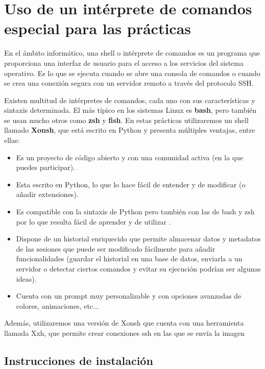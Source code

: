 \section{Uso de un intérprete de comandos especial para las prácticas}

En el ámbito informático, una shell o intérprete de comandos es un programa que proporciona una interfaz de usuario para el acceso a los servicios del sistema operativo. Es lo que se ejecuta cuando se abre una consola de comandos o cuando se crea una conexión segura con un servidor remoto a través del protocolo SSH.

Existen multitud de intérpretes de comandos, cada uno con sus características y sintaxis determinada. El más típico en los sistemas Linux es \textbf{bash}, pero también se usan mucho otros como \textbf{zsh} y \textbf{fish}. En estas prácticas utilizaremos un shell llamado \textbf{Xonsh}, que está escrito en Python y presenta múltiples ventajas, entre ellas:

\begin{itemize}
    \item Es un proyecto de código abierto y con una comunidad activa (en la que puedes participar).
    \item Esta escrito en Python, lo que lo hace fácil de entender y de modificar (o añadir extensiones).
    \item Es compatible con la sintaxis de Python pero también con las de bash y zsh por lo que resulta fácil de aprender y de utilizar \cite{tutorial_xonsh}.
    \item Dispone de un historial enriquecido que permite almacenar datos y metadatos de las sesiones  que puede ser modificado fácilmente para añadir funcionalidades (guardar el historial en una base de datos, enviarla a un servidor o detectar ciertos comandos y evitar su ejecución podrían ser algunas ideas).
    \item Cuenta con un prompt muy personalizable y con opciones avanzadas de colores, animaciones, etc...
\end{itemize}

Además, utilizaremos una versión de Xonsh que cuenta con una herramienta llamada Xxh, que permite crear conexiones ssh en las que se envía la imagen 

\subsection{Instrucciones de instalación}

